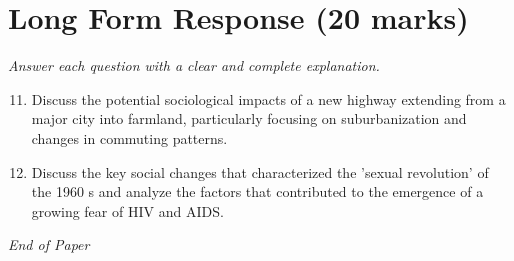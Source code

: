 \documentclass[12pt]{article}
\begin{document}
\section*{Long Form Response (20 marks)}
\textit{Answer each question with a clear and complete explanation.}
\begin{enumerate}[label=\arabic*.]
\setcounter{enumi}{10}
\item Discuss the potential sociological impacts of a new highway extending from a major city into farmland, particularly focusing on suburbanization and changes in commuting patterns.
\item Discuss the key social changes that characterized the 'sexual revolution' of the 1960 s and analyze the factors that contributed to the emergence of a growing fear of HIV and AIDS.
\end{enumerate}

\vfill
\noindent\textit{End of Paper}
\end{document}
